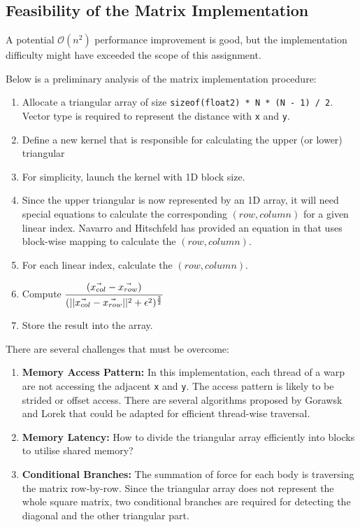 \documentclass[12pt, a4paper]{article}
\begin{document}
\subsection{Feasibility of the Matrix Implementation} \label{subsec:triangular_matrix}
A potential \(\mathcal{O}(n^2)\) performance improvement is good, but the implementation difficulty
might have exceeded the scope of this assignment.

Below is a preliminary analysis of the matrix implementation procedure:
\begin{enumerate}
  \item Allocate a triangular array of size \texttt{sizeof(float2) * N * (N - 1) / 2}.
  Vector type is required to represent the distance with \texttt{x} and \texttt{y}.
  \item Define a new kernel that is responsible for calculating the upper (or lower) triangular
  \item For simplicity, launch the kernel with 1D block size.
  \item Since the upper triangular is now represented by an 1D array, it will need special equations
  to calculate the corresponding \((row, column)\) for a given linear index. Navarro and Hitschfeld
  \cite{navarro_2014} has provided an equation in that uses block-wise mapping to calculate the
  \((row, column)\).
  \item For each linear index, calculate the \((row, column)\).
  \item Compute \(\cfrac{(\vec{x_{col}} - \vec{x_{row}})}{(||\vec{x_{col}} - \vec{x_{row}}||^2 +
  \epsilon^2)^\frac{3}{2}}\)
  \item Store the result into the array.
\end{enumerate}
\bigskip
\noindent There are several challenges that must be overcome:
\begin{enumerate}
  \item \textbf{Memory Access Pattern:} In this implementation, each thread of a warp are not
  accessing the adjacent \texttt{x} and \texttt{y}. The access pattern is likely to be strided or
  offset access. There are several algorithms proposed by Gorawsk and Lorek \cite{gorawsk_2017} that
  could be adapted for efficient thread-wise traversal.
  \item \textbf{Memory Latency:} How to divide the triangular array efficiently into blocks to
  utilise shared memory?
  \item \textbf{Conditional Branches:} The summation of force for each body is traversing the matrix
  row-by-row. Since the triangular array does not represent the whole square matrix, two conditional
  branches are required for detecting the diagonal and the other triangular part.
\end{enumerate}
\end{document}
